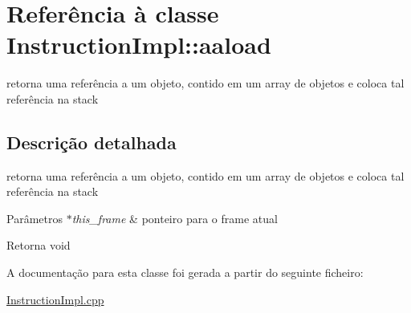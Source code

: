 \hypertarget{class_instruction_impl_1_1aaload}{}\section{Referência à classe Instruction\+Impl\+:\+:aaload}
\label{class_instruction_impl_1_1aaload}


retorna uma referência a um objeto, contido em um array de objetos e coloca tal referência na stack  




\subsection{Descrição detalhada}
retorna uma referência a um objeto, contido em um array de objetos e coloca tal referência na stack 


\begin{DoxyParams}{Parâmetros}
{\em $\ast$this\+\_\+frame} & ponteiro para o frame atual \\
\hline
\end{DoxyParams}
\begin{DoxyReturn}{Retorna}
void 
\end{DoxyReturn}


A documentação para esta classe foi gerada a partir do seguinte ficheiro\+:\begin{DoxyCompactItemize}
\item 
\hyperlink{_instruction_impl_8cpp}{Instruction\+Impl.\+cpp}\end{DoxyCompactItemize}
